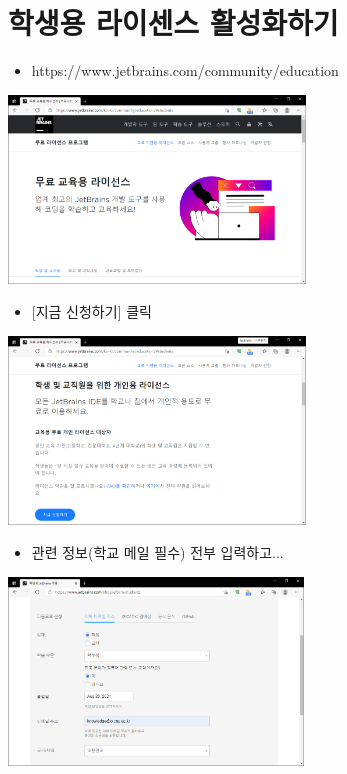 \documentclass{beamer}
\begin{document}
\section{학생용 라이센스 활성화하기}
    \begin{frame}
        \begin{itemize}
            \item https://www.jetbrains.com/community/education
        \end{itemize}
        \begin{center}
            \includegraphics[height=5cm]{Images/jetbrains-1.png}
        \end{center}
    \end{frame}
    \begin{frame}
        \begin{itemize}
            \item {[지금 신청하기]} 클릭
        \end{itemize}
        \begin{center}
            \includegraphics[height=5cm]{Images/jetbrains-2.png}
        \end{center}
    \end{frame}
    \begin{frame}
        \begin{itemize}
            \item 관련 정보(학교 메일 필수) 전부 입력하고...
        \end{itemize}
        \begin{center}
            \includegraphics[height=5cm]{Images/jetbrains-3.png}
        \end{center}
    \end{frame}
\end{document}
